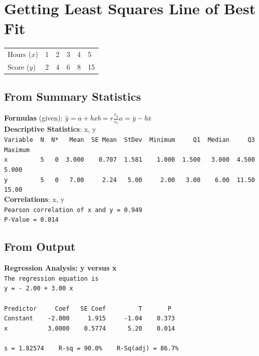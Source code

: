 \documentclass[9pt, oneside]{extarticle}     %
\begin{document}
\section{Getting Least Squares Line of Best Fit} %

 \begin{table}[ht]
 \centering
 \begin{tabular*}{6cm}[h]{llllll}
 Hours ($x$) & 1 & 2 & 3 & 4 & 5   \\
 Score ($y$) & 2 & 4 & 6 & 8 & 15
 \end{tabular*}
 \end{table}

\subsection{From Summary Statistics} %
\label{sub:from_summary_statistics}
{\bf Formulas} (given): $\hat{y} = a + bx$\quad\quad$b = r\frac{s_y}{s_x}$\quad\quad$a=\bar{y}-b\bar{x}$\\[.2in]
{\bf Descriptive Statistics}: x, y\\
\verb|Variable  N  N*   Mean  SE Mean  StDev  Minimum     Q1  Median     Q3  Maximum|\\
\verb|x         5   0  3.000    0.707  1.581    1.000  1.500   3.000  4.500    5.000|\\
\verb|y         5   0   7.00     2.24   5.00     2.00   3.00    6.00  11.50    15.00|\\[.1in]
{\bf Correlations}: x, y \\
\verb|Pearson correlation of x and y = 0.949|\\
\verb|P-Value = 0.014|\\[.5in]



\newpage

\subsection{From Output} %
\label{sub:from_output}

{\bf Regression Analysis: y versus x}\\
\verb|The regression equation is|\\
\verb|y = - 2.00 + 3.00 x|\\
\verb||\\
\verb|Predictor     Coef   SE Coef         T       P|\\
\verb|Constant    -2.000     1.915     -1.04    0.373|\\
\verb|x           3.0000    0.5774      5.20    0.014|\\
\verb||\\
\verb|s = 1.82574    R-sq = 90.0%    R-Sq(adj) = 86.7%|
\verb||\\
\end{document}
